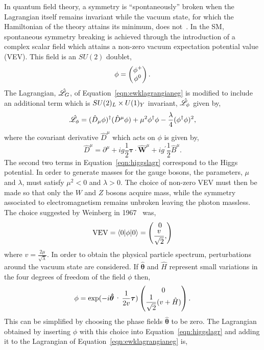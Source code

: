 In quantum field theory, a symmetry is ``spontaneously'' broken when the Lagrangian
itself remains invariant while the vacuum state, for which the Hamiltonian of the theory
attains its minimum, does not~\cite{null}. In the SM, spontaneous symmetry breaking is
achieved through the introduction of a complex scalar field which attains a non-zero 
vacuum expectation potential value (VEV). 
This field is an $SU(2)$ doublet,
\begin{equation}
\phi = 
\everymath{\displaystyle} \begin{pmatrix}
\phi^{+} \\ 
\phi^{0}
\end{pmatrix}.
\end{equation}
The Lagrangian, $\hat{\mathscr{L}}_{G}$, of Equation~\ref{eqn:ewklagrangianeg} is modified to include
an additional term which is $SU(2)_{L}\times U(1)_{Y}$ invariant, $\hat{\mathscr{L}}_{\phi}$
given by, 
\begin{equation}
\hat{\mathscr{L}}_{\phi}=(\hat{D}_{\mu}\phi)^{\dagger}(\hat{D}^{\mu}\phi)  
	    +\mu^{2} \phi^{\dagger}\phi - \frac{\lambda}{4}(\phi^{\dagger}\phi)^{2},
\label{eqn:higgslagr}
\end{equation}
where the covariant derivative $\hat{D}^{\mu}$ which acts on $\phi$ is given by,
\begin{equation}
\hat{D}^{\mu} = \partial^{\mu} + ig\frac{1}{2}\boldsymbol{\tau}\cdot\hat{\mathbf{W}}^{\mu}
		+ ig^{\prime}\frac{1}{2} \hat{B}^{\mu}.
\end{equation}
The second two terms in Equation~\ref{eqn:higgslagr} correspond to the Higgs potential. 
In order to generate masses for the gauge bosons, the parameters, $\mu$ and $\lambda$,
must satisfy $\mu^{2}<0$ and $\lambda>0$. The choice of non-zero 
VEV must then be made so that only the $W$ and $Z$ bosons acquire mass, while the 
symmetry associated to electromagnetism remains unbroken leaving the photon massless.
The choice suggested by Weinberg in 1967~\citep{null} was,
\begin{equation}
\mathrm{VEV} = \langle0|\phi|0\rangle = 
\everymath{\displaystyle} \begin{pmatrix}
0 \\ 
\frac{v}{\sqrt{2}},
\end{pmatrix}
\end{equation}
where $v= \frac{\displaystyle 2\mu}{\displaystyle \sqrt{\lambda}}$. In order to 
obtain the physical particle spectrum, perturbations around the vacuum state
are considered. If $\boldsymbol{\hat{\theta}}$ and $\hat{H}$ represent small variations in 
the four degrees of freedom of the field $\phi$ then, 
\begin{equation}
\phi = \exp(-i\boldsymbol{\hat{\theta}}\cdot\frac{1}{2v}\boldsymbol{\tau}) 
\everymath{\displaystyle} \begin{pmatrix}
0 \\ 
\frac{1}{\sqrt{2}}(v+\hat{H})
\end{pmatrix}.
\end{equation}
This can be simplified by choosing the phase fields $\boldsymbol{\hat{\theta}}$ 
to be zero. The Lagrangian obtained by inserting $\phi$ with this choice 
into Equation~\ref{eqn:higgslagr} and adding it to the Lagrangian of 
Equation~\ref{eqn:ewklagrangianeg} is,


